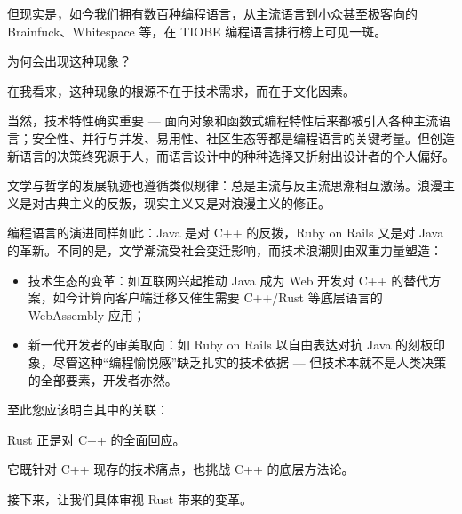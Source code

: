 但现实是，如今我们拥有数百种编程语言，从主流语言到小众甚至极客向的 Brainfuck、Whitespace 等，在 TIOBE 编程语言排行榜上可见一斑。

为何会出现这种现象？

在我看来，这种现象的根源不在于技术需求，而在于文化因素。

当然，技术特性确实重要 --- 面向对象和函数式编程特性后来都被引入各种主流语言；安全性、并行与并发、易用性、社区生态等都是编程语言的关键考量。但创造新语言的决策终究源于人，而语言设计中的种种选择又折射出设计者的个人偏好。

文学与哲学的发展轨迹也遵循类似规律：总是主流与反主流思潮相互激荡。浪漫主义是对古典主义的反叛，现实主义又是对浪漫主义的修正。

编程语言的演进同样如此：Java 是对 C++ 的反拨，Ruby on Rails 又是对 Java 的革新。不同的是，文学潮流受社会变迁影响，而技术浪潮则由双重力量塑造：

\begin{itemize}
\item 
技术生态的变革：如互联网兴起推动 Java 成为 Web 开发对 C++ 的替代方案，如今计算向客户端迁移又催生需要 C++/Rust 等底层语言的 WebAssembly 应用；

\item 
新一代开发者的审美取向：如 Ruby on Rails 以自由表达对抗 Java 的刻板印象，尽管这种“编程愉悦感”缺乏扎实的技术依据 --- 但技术本就不是人类决策的全部要素，开发者亦然。
\end{itemize}

至此您应该明白其中的关联：

Rust 正是对 C++ 的全面回应。

它既针对 C++ 现存的技术痛点，也挑战 C++ 的底层方法论。

接下来，让我们具体审视 Rust 带来的变革。













